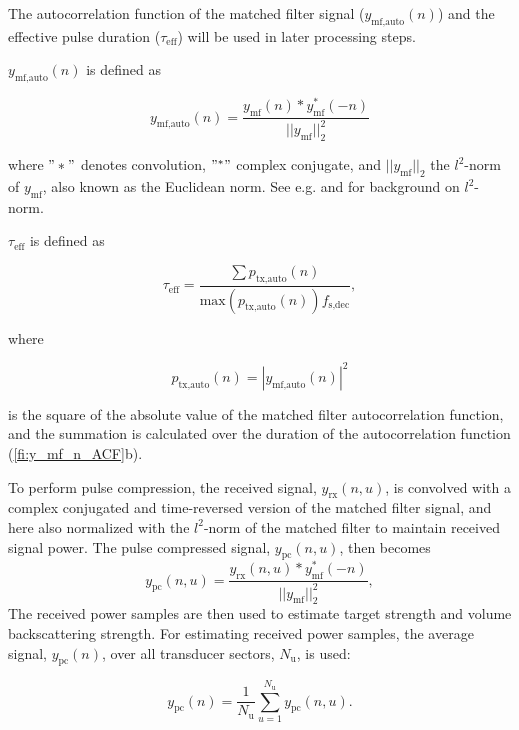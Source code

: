 \documentclass[preprint,12pt,TurnOnLineNumbers]{JASAnew}
\newcommand{\samplesymt}{n}
\newcommand{\channelsym}{u}
\newcommand{\nchannels}{N_{\textrm{u}}}
\newcommand{\fsdec}{f_{\textrm{s,dec}}}
\newcommand{\teff}{\tau_{\textrm{eff}}}
\newcommand{\yrx}{y_{\textrm{rx}}}
\newcommand{\ymf}{y_{\textrm{mf}}}
\newcommand{\ypc}{y_{\textrm{pc}}}
\newcommand{\ymfauto}{y_{\textrm{mf,auto}}}
\newcommand{\ptxauto}{p_{\textrm{tx,auto}}}
\begin{document}
The autocorrelation function of the matched filter signal ($\ymfauto(\samplesymt)$) and the effective pulse duration ($\teff$) will be used in later processing steps.  

$\ymfauto(\samplesymt)$ is defined as

\begin{equation}
\label{eq:TXAuto}
\ymfauto(\samplesymt) = \frac{\ymf(\samplesymt)*\ymf^*(-\samplesymt)}{||\ymf||^2_2}
\end{equation}

where $"*"$ denotes convolution, $"^*"$ complex conjugate, and $||\ymf||_2$ the $l^2$-norm of $\ymf$, also known as the Euclidean norm. See e.g. \citet{PadgettSigProc} and \citet{GhatakR} for background on $l^2$-norm.  

$\teff$ is defined as

\begin{equation}
\label{eq:TauEff}
\teff = \frac{\sum \ptxauto(\samplesymt)}{\textrm{max}(\ptxauto(\samplesymt))\fsdec},
\end{equation}

where

\begin{equation*}
\ptxauto(\samplesymt)  =  |\ymfauto(\samplesymt)|^2
\end{equation*}

is the square of the absolute value of the matched filter autocorrelation function, and the summation is calculated over the duration of the autocorrelation function (\autoref{fi:y_mf_n_ACF}b).

To perform pulse compression, the received signal, $\yrx(\samplesymt,\channelsym)$, is convolved with a complex conjugated and time-reversed version of the matched filter signal, and here also normalized with the $l^2$-norm of the matched filter to maintain received signal power. The pulse compressed signal, $\ypc(\samplesymt,\channelsym)$, then becomes
\begin{equation}
\label{eq:PulseComp}
\ypc(\samplesymt,\channelsym) = \frac{\yrx(\samplesymt,\channelsym)*\ymf^*(-\samplesymt)}{||\ymf||^2_2},
\end{equation}
%
The received power samples are then used to estimate target strength and volume backscattering strength. For estimating received power samples, the average signal, $\ypc(\samplesymt)$, over all transducer sectors, $\nchannels$, is used:

\begin{equation}
\label{eq:SumSig}
\ypc(\samplesymt) = \frac{1}{\nchannels} \sum_{\channelsym = 1}^{\nchannels} \ypc(\samplesymt,\channelsym).
\end{equation}
\end{document}
